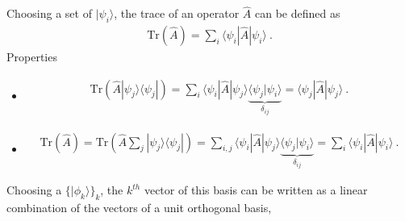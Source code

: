 \documentclass[letterpaper,10pt,english]{jupyterBook}
\begin{document}
\sphinxAtStartPar
Choosing a set of  \(| \psi_i \rangle\), the trace of an operator \(\hat{A}\) can be defined as
\begin{equation*}
\begin{split}\text{Tr}\left( \hat{A} \right) = \sum_{i} \langle \psi_i | \hat{A} | \psi_i \rangle \ .\end{split}
\end{equation*}
\sphinxAtStartPar
Properties
\begin{itemize}
\item {} \begin{equation*}
\begin{split}\text{Tr}\left( \hat{A} | \psi_j \rangle \langle \psi_j | \right) = \sum_{i} \langle \psi_i | \hat{A} | \psi_j \rangle \underbrace{\langle \psi_j | \psi_i \rangle}_{\delta_{ij}} = \langle \psi_j | \hat{A}| \psi_j \rangle \ . \end{split}
\end{equation*}
\item {} \begin{equation*}
\begin{split}\text{Tr}\left( \hat{A}\right) = \text{Tr}\left( \hat{A} \sum_j | \psi_j \rangle \langle \psi_j | \right) = \sum_{i,j} \langle \psi_i | \hat{A} | \psi_j \rangle \underbrace{\langle \psi_j | \psi_i \rangle}_{\delta_{ij}} = \sum_i \langle \psi_i | \hat{A}| \psi_i \rangle \ . \end{split}
\end{equation*}
\end{itemize}

\sphinxAtStartPar
Choosing a  \(\{ | \phi_k \rangle \}_k\), the \(k^{th}\) vector of this basis can be written as a linear combination of the vectors of a unit orthogonal basis,
\end{document}
